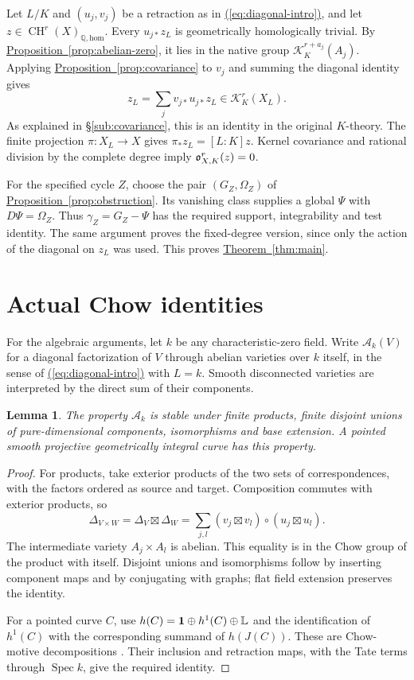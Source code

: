\documentclass[11pt,a4paper]{article}
\newtheorem{lemma}[theorem]{Lemma}
\theoremstyle{definition}
\theoremstyle{remark}\newtheorem{remark}[theorem]{Remark}
\numberwithin{equation}{section}
\newcommand{\Q}{\mathbb Q}\newcommand{\R}{\mathbb R}\newcommand{\C}{\mathbb C}
\newcommand{\CH}{\operatorname{CH}}\newcommand{\an}{\mathrm{an}}
\newcommand{\homol}{\mathrm{hom}}\newcommand{\BC}{\mathrm{BC}}
\newcommand{\Spec}{\operatorname{Spec}}\newcommand{\Bl}{\operatorname{Bl}}
\newcommand{\subref}[1]{\hyperref[#1]{\textcolor{sectionlink}{\S\ref*{#1}}}}
\newcommand{\thmref}[1]{\hyperref[#1]{\textcolor{resultlink}{Theorem~\ref*{#1}}}}
\newcommand{\propref}[1]{\hyperref[#1]{\textcolor{resultlink}{Proposition~\ref*{#1}}}}
\renewcommand{\eqref}[1]{\hyperref[#1]{\textcolor{equationlink}{(\ref*{#1})}}}
\begin{document}
Let $L/K$ and $(u_j,v_j)$ be a retraction as in
\eqref{eq:diagonal-intro}, and let $z\in\CH^r(X)_{\Q,\homol}$.
Every $u_{j*}z_L$ is geometrically homologically trivial.
By \propref{prop:abelian-zero}, it lies in the native group
$\mathcal K_K^{r+a_j}(A_j)$. Applying \propref{prop:covariance} to
$v_j$ and summing the diagonal identity gives
\[
               z_L=\sum_jv_{j*}u_{j*}z_L\in\mathcal K_K^r(X_L).
\]
As explained in \subref{sub:covariance}, this is an identity in the
original $K$-theory. The finite projection $\pi:X_L\to X$ gives
$\pi_*z_L=[L:K]z$. Kernel covariance and rational division by the
complete degree imply $\mathfrak o^r_{X,K}(z)=0$.

For the specified cycle $Z$, choose the pair $(G_Z,\Omega_Z)$ of
\propref{prop:obstruction}. Its vanishing class supplies a global
$\Psi$ with $D\Psi=\Omega_Z$. Thus $\gamma_Z=G_Z-\Psi$ has
the required support, integrability and test identity. The same
argument proves the fixed-degree version, since only the action
of the diagonal on $z_L$ was used. This proves \thmref{thm:main}.





\section{Actual Chow identities}\label{sec:chow}

For the algebraic arguments, let $k$ be any characteristic-zero
field. Write $\mathcal A_k(V)$ for a diagonal factorization of $V$
through abelian varieties over $k$ itself, in the sense of
\eqref{eq:diagonal-intro} with $L=k$. Smooth disconnected varieties
are interpreted by the direct sum of their components.

\begin{lemma}\label{lem:tensor}
The property $\mathcal A_k$ is stable under finite products, finite
disjoint unions of pure-dimensional components, isomorphisms and
base extension. A pointed smooth projective geometrically integral
curve has this property.
\end{lemma}

\begin{proof}
For products, take exterior products of the two sets of
correspondences, with the factors ordered as source and target.
Composition commutes with exterior products, so
\[
 \Delta_{V\times W}=\Delta_V\boxtimes\Delta_W
       =\sum_{j,l}(v_j\boxtimes v_l)\circ(u_j\boxtimes u_l).
\]
The intermediate variety $A_j\times A_l$ is abelian. This equality
is in the Chow group of the product with itself. Disjoint unions
and isomorphisms follow by inserting component maps and by conjugating
with graphs; flat field extension preserves the identity.

For a pointed curve $C$, use
$h(C)=\mathbf1\oplus h^1(C)\oplus\mathbb L$ and the identification of
$h^1(C)$ with the corresponding summand of $h(J(C))$. These are
Chow-motive decompositions \cite[\S3.2, Proposition 4.5 and
Theorems 5.2--5.3]{Scholl}. Their inclusion and retraction maps,
with the Tate terms through $\Spec k$, give the required identity.
\end{proof}
\end{document}
